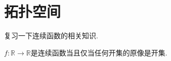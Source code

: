 \chapter{拓扑空间}

复习一下连续函数的相关知识.

\begin{theorem}{}
    $f:\mathbb{R}\to\mathbb{R}$是连续函数当且仅当任何开集的原像是开集.
\end{theorem}
